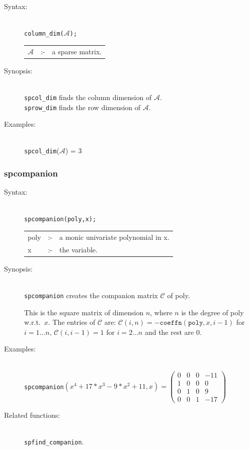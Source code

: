 \begin{description}
\item[Syntax:]\mbox{}\\
{\tt column\_dim($\mathcal{A}$);}\\[2mm]
\begin{tabular}{l l l}
$\mathcal{A}$ &:-& a sparse matrix.
\end{tabular}

\item[Synopsis:]\mbox{}\\
\texttt{spcol\_dim} finds the column dimension of
                $\mathcal{A}$. \\
\texttt{sprow\_dim} finds the row dimension of $\mathcal{A}$.

\item[Examples:]\mbox{}\\
\texttt{spcol\_dim}($\mathcal{A}$) = 3
\end{description}

\subsubsection{spcompanion}
\label{sparse:spcompanion}
\hypertarget{operator:SPCOMPANION}{}

\begin{description}
\item[Syntax:]\mbox{}\\
\texttt{spcompanion(poly,x);}\\[2mm]
\begin{tabular}{l l l}
poly &:-& a monic univariate polynomial in x. \\
x    &:-& the variable.
\end{tabular}

\item[Synopsis:]\mbox{}\\
                \texttt{spcompanion} creates the companion matrix $\mathcal{C}$
                of poly.

This is the square matrix of dimension $n$, where $n$ is the degree of poly
w.r.t.\ $x$.
The entries of $\mathcal{C}$ are:
                $\mathcal{C}(i,n) = -\texttt{coeffn}(\texttt{poly},x,i-1)$ for $i = 1
                \ldots n$, $\mathcal{C}(i,i-1) = 1$ for $i = 2 \ldots n$ and
                the rest are $0$.

\item[Examples:]\mbox{}\\
\texttt{spcompanion}\((x^4+17*x^3-9*x^2+11,x) =
\begin{pmatrix}
  0 & 0 & 0 & -11 \\ 1 & 0 & 0 & 0 \\ 0 & 1 & 0 & 9 \\ 0 & 0 & 1 & -17
\end{pmatrix}
\)

\item[Related functions:]\mbox{}\\
\texttt{spfind\_companion}.
\end{description}

